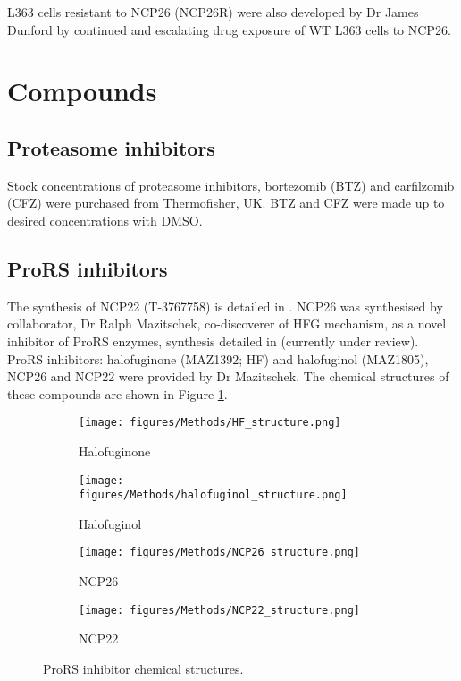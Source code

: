 L363 cells resistant to NCP26 (NCP26R) were also developed by Dr James Dunford by continued and escalating drug exposure of WT L363 cells to NCP26.

\section{Compounds}

\subsection{Proteasome inhibitors}
Stock concentrations of proteasome inhibitors, bortezomib (BTZ) and carfilzomib (CFZ) were purchased from Thermofisher, UK.
BTZ and CFZ were made up to desired concentrations with DMSO\@.

\subsection{ProRS inhibitors}
The synthesis of NCP22 (T-3767758) is detailed in \cite{adachi2017discovery}.
NCP26 was synthesised by collaborator,  Dr Ralph Mazitschek, co-discoverer of HFG mechanism, as a novel inhibitor of ProRS enzymes, synthesis detailed in \cite{tyediscovery2021} (currently under review).
ProRS inhibitors: halofuginone (MAZ1392; HF) and halofuginol (MAZ1805), NCP26 and NCP22 were provided by Dr Mazitschek.
The chemical structures of these compounds are shown in Figure \ref{fig:chem_structures}.

\begin{figure}[ht]
\centering
\begin{subfigure}{0.49\textwidth}
    \texttt{[image: figures/Methods/HF\_structure.png]}
    \caption{Halofuginone}
\end{subfigure}
\begin{subfigure}{0.49\textwidth}
    \texttt{[image: figures/Methods/halofuginol\_structure.png]}
    \caption{Halofuginol}
\end{subfigure}
%
\medskip
\begin{subfigure}{0.45\textwidth}
    \texttt{[image: figures/Methods/NCP26\_structure.png]}
    \caption{NCP26}
\end{subfigure}
\begin{subfigure}{0.45\textwidth}
    \texttt{[image: figures/Methods/NCP22\_structure.png]}
    \caption{NCP22}
\end{subfigure}
\caption[ProRS inhibitor chemical structures]{ProRS inhibitor chemical structures.
}
\label{fig:chem_structures}
\end{figure}

